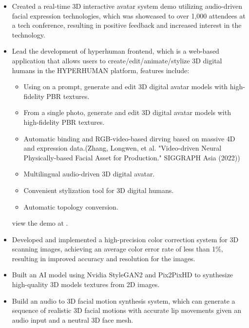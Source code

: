 \documentclass{resume}
\begin{document}

\begin{itemize}
  \item Created a real-time 3D interactive avatar system demo utilizing audio-driven facial expression technologies, which was showcased to over 1,000 attendees at a tech conference, resulting in positive feedback and increased interest in the technology.
  \item Lead the development of hyperhuman frontend, which is a web-based application that allows users to create/edit/animate/stylize 3D digital humans in the HYPERHUMAN platform, features include:
  \begin{itemize}
    \item Using on a prompt, generate and edit 3D digital avatar models with high-fidelity PBR textures. 
    \item From a single photo, generate and edit 3D digital avatar models with high-fidelity PBR textures.
    \item Automatic binding and RGB-video-based dirving based on massive 4D and expression data.(Zhang, Longwen, et al. "Video-driven Neural Physically-based Facial Asset for Production." SIGGRAPH Asia (2022))
    \item Multilingual audio-driven 3D digital avatar.
    \item Convenient stylization tool for 3D digital humans.
    \item Automatic topology conversion.
  \end{itemize}
   view the demo at .
\end{itemize}


\begin{itemize}
  \item Developed and implemented a high-precision color correction system for 3D scanning images, achieving an average color error rate of less than 1\%, resulting in improved accuracy and resolution for the images.
  \item Built an AI model using Nvidia StyleGAN2 and Pix2PixHD to synthesize high-quality 3D models textures from 2D images.
  \item Build an audio to 3D facial motion synthesis system, which can generate a sequence of realistic 3D facial motions with accurate lip movements given an audio input and a neutral 3D face mesh.
\end{itemize}
\end{document}
